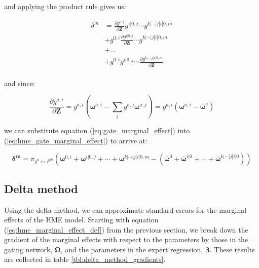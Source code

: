 \documentclass[12pt]{article}
\newcommand{\mean}[1]{\bar{#1}}
\newcommand{\gateprod}[2]{\pi_{#1 \longleftrightarrow #2}}
\begin{document}
and applying the product rule gives us:

\begin{equation} \label{eq:hme_gate_marginal_effect}
  \begin{split}
    \delta^{m} &= \frac{\partial g^{0, i}}{\partial \boldsymbol{Z}} g^{i|0, j} \cdots g^{k|\cdots|j|i|0, m}                       \\
                                     &+ g^{0, i} \frac{\partial g^{i|0, j}}{\partial \boldsymbol{Z}} \cdots g^{k|\cdots|j|i|0, m} \\
                                     &+ \dots                                                                                     \\
                                     &+ g^{0, i} g^{i|0, j} \cdots \frac{\partial g^{k|\cdots|j|i|0, m}}{\partial \boldsymbol{Z}} \\
  \end{split}
\end{equation}

and since:

\begin{equation} \label{eq:gate_marginal_effect}
  \frac{\partial g^{a, i}}{\partial \boldsymbol{Z}} = g^{a, i} \left( \boldsymbol{\omega}^{a, i} - \sum_{j} g^{a, j} \boldsymbol{\omega}^{a, j} \right) = g^{a, i} \left( \boldsymbol{\omega}^{a, i} - \mean{\boldsymbol{\omega}}^{a} \right)
\end{equation}

we can substitute equation (\ref{eq:gate_marginal_effect}) into
(\ref{eq:hme_gate_marginal_effect}) to arrive at:

\begin{equation} \label{eq:marginal_effects}
  \boldsymbol{\delta^{m}} = \gateprod{g^{0}}{P^{m}} \left(\boldsymbol{\omega}^{0, i} + \boldsymbol{\omega}^{i|0, j} + \cdots + \boldsymbol{\omega}^{k|\cdots|j|i|0, m} - \left( \mean{\boldsymbol{\omega}}^{0} + \mean{\boldsymbol{\omega}}^{i|0} + \cdots + \mean{\boldsymbol{\omega}}^{k|\cdots|j|i|0} \right) \right)
\end{equation}


\subsection{Delta method}

Using the delta method, we can approximate standard
errors for the marginal effects of the HME model. Starting with equation
(\ref{eq:hme_marginal_effect_def}) from the previous section, we break down
the gradient of the marginal effects with respect to the parameters by those 
in the gating network, $\boldsymbol{\Omega}$, and the parameters in the
expert regression, $\boldsymbol{\beta}$. These results are collected in table
 \ref{tbl:delta_method_gradients}.
\end{document}
